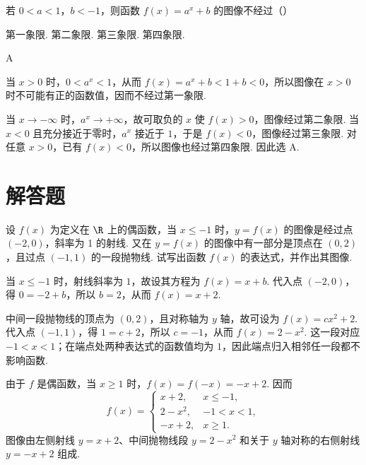 \begin{problem}
若 \(0 < a < 1\)，\(b < -1\)，则函数 \(f(x) = a^x + b\) 的图像不经过（\quad）

\choices
    {第一象限.}
    {第二象限.}
    {第三象限.}
    {第四象限.}
\end{problem}

\begin{answer}
A
\end{answer}

\begin{solution}
当 \(x>0\) 时，\(0<a^x<1\)，从而 \(f(x)=a^x+b<1+b<0\)，所以图像在 \(x>0\) 时不可能有正的函数值，因而不经过第一象限.

当 \(x\to-\infty\) 时，\(a^x\to+\infty\)，故可取负的 \(x\) 使 \(f(x)>0\)，图像经过第二象限. 当 \(x<0\) 且充分接近于零时，\(a^x\) 接近于 \(1\)，于是 \(f(x)<0\)，图像经过第三象限. 对任意 \(x>0\)，已有 \(f(x)<0\)，所以图像也经过第四象限. 因此选 A.
\end{solution}

\section{解答题}
\begin{problem}
设 \(f(x)\) 为定义在 \(\R\) 上的偶函数，当 \(x \leqslant -1\) 时，\(y = f(x)\) 的图像是经过点 \((-2,0)\)，斜率为 1 的射线. 又在 \(y = f(x)\) 的图像中有一部分是顶点在 \((0,2)\)，且过点 \((-1,1)\) 的一段抛物线. 试写出函数 \(f(x)\) 的表达式，并作出其图像.

\end{problem}

\begin{solution}
当 \(x\leqslant-1\) 时，射线斜率为 \(1\)，故设其方程为 \(f(x)=x+b\). 代入点 \((-2,0)\)，得 \(0=-2+b\)，所以 \(b=2\)，从而 \(f(x)=x+2\).

中间一段抛物线的顶点为 \((0,2)\)，且对称轴为 \(y\) 轴，故可设为 \(f(x)=cx^2+2\). 代入点 \((-1,1)\)，得 \(1=c+2\)，所以 \(c=-1\)，从而 \(f(x)=2-x^2\). 这一段对应 \(-1<x<1\)；在端点处两种表达式的函数值均为 \(1\)，因此端点归入相邻任一段都不影响函数.

由于 \(f\) 是偶函数，当 \(x\geqslant1\) 时，\(f(x)=f(-x)=-x+2\). 因而
\[
f(x)=\begin{cases}
x+2,&x\leqslant-1,\\
2-x^2,&-1<x<1,\\
-x+2,&x\geqslant1.
\end{cases}
\]
图像由左侧射线 \(y=x+2\)、中间抛物线段 \(y=2-x^2\) 和关于 \(y\) 轴对称的右侧射线 \(y=-x+2\) 组成.

\end{solution}


